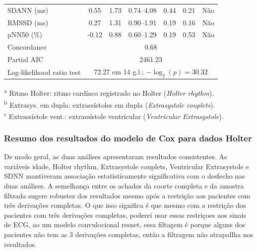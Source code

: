 \begin{table}[htbp]
{\begin{tabular}{lcccccc}
			SDANN (ms)                                & 0.55                                                     & 1.73 & 0.74--4.08 & 0.44 & 0.21     & N\~ao           \\
			RMSSD (ms)                                & 0.27                                                     & 1.31 & 0.90--1.91 & 0.19 & 0.16     & N\~ao           \\
			pNN50 (\%)                                & -0.12                                                    & 0.88 & 0.60--1.29 & 0.19 & 0.53     & N\~ao           \\
			\midrule
			Concordance                               & \multicolumn{6}{c}{0.68}                                                                                         \\
			Partial AIC                               & \multicolumn{6}{c}{2461.23}                                                                                      \\
			Log-likelihood ratio test                 & \multicolumn{6}{c}{72.27 em 14 g.l.; $-\log_2(p)=30.32$}                                                         \\
			\bottomrule
		\end{tabular}%
	}
	\begin{flushleft}
		\footnotesize
		\textsuperscript{a} Ritmo Holter: ritmo cardíaco registrado no Holter (\textit{Holter rhythm}).\\
		\textsuperscript{b} Extrasys. em dupla: extrassístoles em dupla (\textit{Extrasystole couplets}).\\
		\textsuperscript{c} Extrassístole vent.: extrassístole ventricular (\textit{Ventricular Extrasystole}).
	\end{flushleft}
\end{table}

\FloatBarrier
\subsubsection{Resumo dos resultados do modelo de Cox para dados Holter}

De modo geral, as duas análises apresentaram resultados consistentes. As variáveis idade, Holter rhythm, Extrasystole couplets, Ventricular Extrasystole e SDNN mantiveram associação estatisticamente significativa com o desfecho nas duas análises. A semelhança entre os achados da coorte completa e da amostra filtrada sugere robustez dos resultados mesmo após a restrição aos pacientes com três derivações completas. O que isso significa é que mesmo com a restrição dos pacientes com três derivações completas, poderei usar essas restriçoes aos sinais de ECG, ao um modelo convulocional resnet, essa filtagem é porque alguns dos pacientes não tem as 3 derivações completas, então a filtragem não atrapallha nos resultados.

